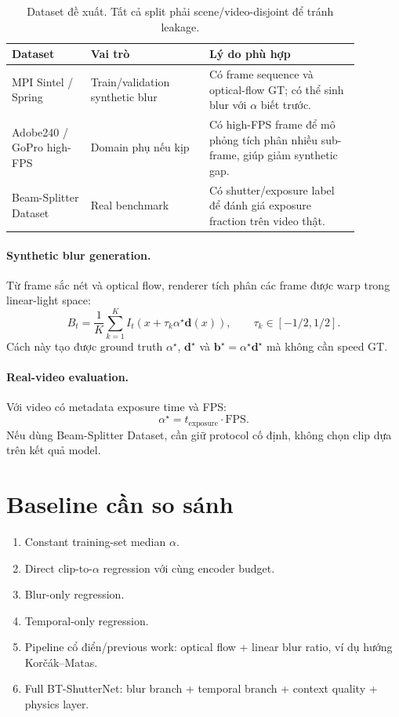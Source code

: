 \documentclass[11pt,a4paper]{article}
\newcommand{\alphagt}{\alpha^{\star}}
\newcommand{\vect}[1]{\mathbf{#1}}
\begin{document}
\begin{table}[h]
\centering
\small
\begin{tabular}{p{0.20\linewidth}p{0.30\linewidth}p{0.38\linewidth}}
\toprule
\textbf{Dataset} & \textbf{Vai trò} & \textbf{Lý do phù hợp} \\
\midrule
MPI Sintel / Spring & Train/validation synthetic blur & Có frame sequence và optical-flow GT; có thể sinh blur với $\alpha$ biết trước. \\
Adobe240 / GoPro high-FPS & Domain phụ nếu kịp & Có high-FPS frame để mô phỏng tích phân nhiều sub-frame, giúp giảm synthetic gap. \\
Beam-Splitter Dataset & Real benchmark & Có shutter/exposure label để đánh giá exposure fraction trên video thật. \\
\bottomrule
\end{tabular}
\caption{Dataset đề xuất. Tất cả split phải scene/video-disjoint để tránh leakage.}
\end{table}

\paragraph{Synthetic blur generation.}
Từ frame sắc nét và optical flow, renderer tích phân các frame được warp trong linear-light space:
\[
    B_t = \frac{1}{K}\sum_{k=1}^{K}
    I_t\!\left(x + \tau_k \alphagt \vect d(x)\right),
    \qquad
    \tau_k \in [-1/2, 1/2].
\]
Cách này tạo được ground truth $\alphagt$, $\vect d^\star$ và $\vect b^\star=\alphagt\vect d^\star$ mà không cần speed GT.

\paragraph{Real-video evaluation.}
Với video có metadata exposure time và FPS:
\[
    \alphagt = t_{\mathrm{exposure}}\cdot \mathrm{FPS}.
\]
Nếu dùng Beam-Splitter Dataset, cần giữ protocol cố định, không chọn clip dựa trên kết quả model.

\section{Baseline cần so sánh}

\begin{enumerate}[leftmargin=1.5em]
    \item Constant training-set median $\alpha$.
    \item Direct clip-to-$\alpha$ regression với cùng encoder budget.
    \item Blur-only regression.
    \item Temporal-only regression.
    \item Pipeline cổ điển/previous work: optical flow + linear blur ratio, ví dụ hướng Korčák--Matas.
    \item Full BT-ShutterNet: blur branch + temporal branch + context quality + physics layer.
\end{enumerate}
\end{document}
